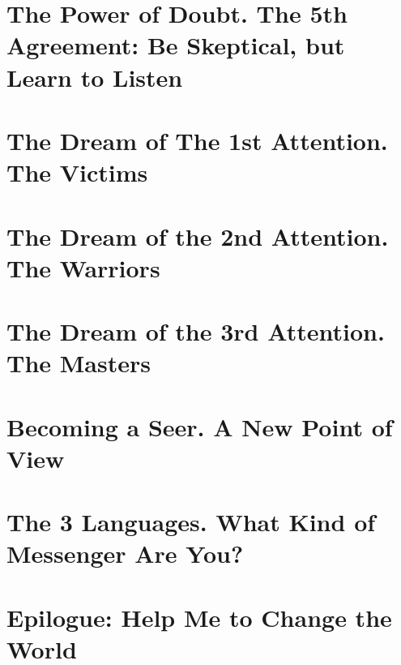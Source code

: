 \documentclass{article}
\numberwithin{equation}{section}
\begin{document}
\section{The Power of Doubt. The 5th Agreement: Be Skeptical, but Learn to Listen}


\section{The Dream of The 1st Attention. The Victims}


\section{The Dream of the 2nd Attention. The Warriors}


\section{The Dream of the 3rd Attention. The Masters}


\section{Becoming a Seer. A New Point of View}


\section{The 3 Languages. What Kind of Messenger Are You?}


\section{Epilogue: Help Me to Change the World}


\printbibliography[heading=bibintoc]
	
\end{document}
